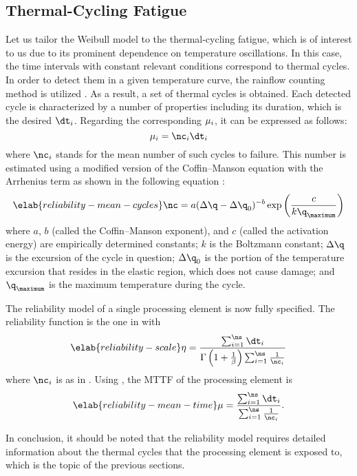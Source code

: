 \subsection{Thermal-Cycling Fatigue}

Let us tailor the Weibull model to the thermal-cycling fatigue, which is of
interest to us due to its prominent dependence on temperature oscillations. In
this case, the time intervals with constant relevant conditions correspond to
thermal cycles. In order to detect them in a given temperature curve, the
rainflow counting method is utilized \cite{xiang2010}. As a result, a set of \ns
thermal cycles is obtained. Each detected cycle is characterized by a number of
properties including its duration, which is the desired $\dt_i$. Regarding the
corresponding $\mu_i$, it can be expressed as follows:
\[
  \mean_i = \nc_i \dt_i
\]
where $\nc_i$ stands for the mean number of such cycles to failure. This number
is estimated using a modified version of the Coffin--Manson equation with the
Arrhenius term as shown in the following equation \cite{xiang2010, jedec2016}:
\begin{equation} \elab{reliability-mean-cycles}
  \nc = a (\Delta \q - \Delta \q_0)^{-b} \exp\left(\frac{c}{k \q_\maximum}\right)
\end{equation}
where $a$, $b$ (called the Coffin--Manson exponent), and $c$ (called the
activation energy) are empirically determined constants; $k$ is the Boltzmann
constant; $\Delta \q$ is the excursion of the cycle in question; $\Delta \q_0$
is the portion of the temperature excursion that resides in the elastic region,
which does not cause damage; and $\q_\maximum$ is the maximum temperature during
the cycle.

The reliability model of a single processing element is now fully specified. The
reliability function is the one in  with
\begin{equation} \elab{reliability-scale}
  \scale = \frac{\sum_{i = 1}^\ns \dt_i}{\Gamma\left(1 + \frac{1}{\shape}\right) \sum_{i = 1}^\ns \frac{1}{\nc_i}}
\end{equation}
where $\nc_i$ is as in . Using
, the \ac{MTTF} of the processing element is
\begin{equation} \elab{reliability-mean-time}
  \mean = \frac{\sum_{i = 1}^\ns \dt_i}{\sum_{i = 1}^\ns \frac{1}{\nc_i}}.
\end{equation}

In conclusion, it should be noted that the reliability model requires detailed
information about the thermal cycles that the processing element is exposed to,
which is the topic of the previous sections.
